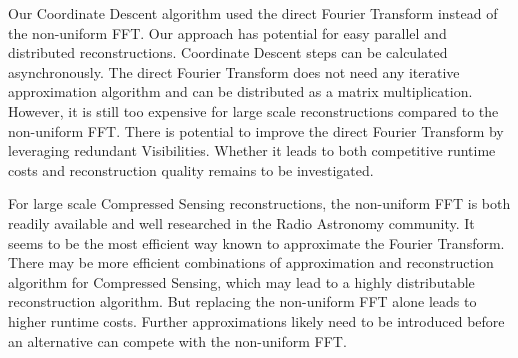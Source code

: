 Our Coordinate Descent algorithm used the direct Fourier Transform instead of the non-uniform FFT. Our approach has potential for easy parallel and distributed reconstructions. Coordinate Descent steps can be calculated asynchronously. The direct Fourier Transform does not need any iterative approximation algorithm and can be distributed as a matrix multiplication. However, it is still too expensive for large scale reconstructions compared to the non-uniform FFT. There is potential to improve the direct Fourier Transform by leveraging redundant Visibilities. Whether it leads to both competitive runtime costs and reconstruction quality remains to be investigated.

For large scale Compressed Sensing reconstructions, the non-uniform FFT is both readily available and well researched in the Radio Astronomy community. It seems to be the most efficient way known to approximate the Fourier Transform. There may be more efficient combinations of approximation and reconstruction algorithm for Compressed Sensing, which may lead to a highly distributable reconstruction algorithm. But replacing the non-uniform FFT alone leads to higher runtime costs. Further approximations likely need to be introduced before an alternative can compete with the non-uniform FFT.





















 